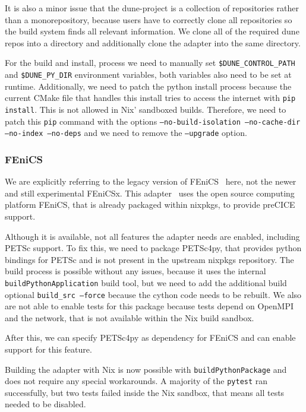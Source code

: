 \documentclass{eceasst}
\begin{document}
It is also a minor issue that the dune-project is a collection of repositories rather than a monorepository, because users have to correctly clone all repositories so the build system finds all relevant information.
We clone all of the required dune repos into a directory and additionally clone the adapter into the same directory.

For the build and install, process we need to manually set \texttt{\$DUNE\_CONTROL\_PATH} and \texttt{\$DUNE\_PY\_DIR} environment variables, both variables also need to be set at runtime.
Additionally, we need to patch the python install process because the current CMake file that handles this install tries to access the internet with \texttt{pip install}.
This is not allowed in Nix' sandboxed builds.
Therefore, we need to patch this \texttt{pip} command with the options \texttt{--no-build-isolation --no-cache-dir --no-index --no-deps} and we need to remove the \texttt{--upgrade} option.\\

\subsubsection{FEniCS}

We are explicitly referring to the legacy version of FEniCS~\cite{fenics} here, not the newer and still experimental FEniCSx.
This adapter~\cite{Rodenberg2021} uses the open source computing platform FEniCS, that is already packaged within nixpkgs, to provide preCICE support.

Although it is available, not all features the adapter needs are enabled, including PETSc support.
To fix this, we need to package PETSc4py, that provides python bindings for PETSc and is not present in the upstream nixpkgs repository.
The build process is possible without any issues, because it uses the internal \texttt{buildPythonApplication} build tool, but we need to add the additional build optional \texttt{build\_src --force} because the cython code needs to be rebuilt.
We also are not able to enable tests for this package because tests depend on OpenMPI and the network, that is not available within the Nix build sandbox.

After this, we can specify PETSc4py as dependency for FEniCS and can enable support for this feature.

Building the adapter with Nix is now possible with \texttt{buildPythonPackage} and does not require any special workarounds.
A majority of the \texttt{pytest} ran successfully, but two tests failed inside the Nix sandbox, that means all tests needed to be disabled.\\
\end{document}
